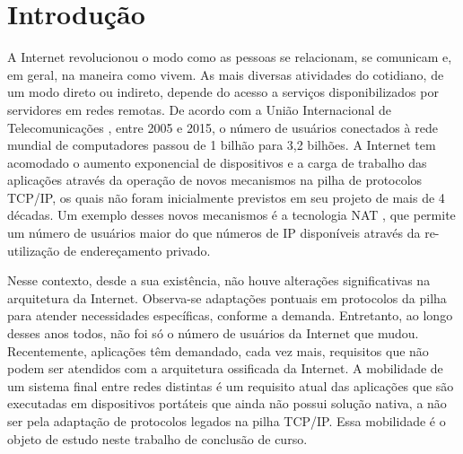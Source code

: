 \documentclass[	12pt, Times, openright, twoside, a4paper, english, brazil]{abntex2}
\begin{document}
\chapter{Introdução}
\setcounter{page}{1}

\par A Internet revolucionou o modo como as pessoas se relacionam, se comunicam e, em geral, na maneira como vivem. As mais diversas atividades do cotidiano, de um modo direto ou indireto, depende do acesso a serviços disponibilizados por servidores em redes remotas. De acordo com a União Internacional de Telecomunicações \cite{itu2016}, entre 2005 e 2015, o número de usuários conectados à rede mundial de computadores passou de 1 bilhão para 3,2 bilhões. A Internet tem acomodado o aumento exponencial de dispositivos e a carga de trabalho das aplicações através da operação de novos mecanismos na pilha de protocolos TCP/IP, os quais não foram inicialmente previstos em seu projeto de mais de 4 décadas. Um exemplo desses novos mecanismos é a tecnologia NAT \cite{rfc4787}, que permite um número de usuários maior do que números de IP disponíveis através da re-utilização de endereçamento privado. 

\par Nesse contexto, desde a sua existência, não houve alterações significativas na arquitetura da Internet. Observa-se adaptações pontuais em protocolos da pilha para atender necessidades específicas, conforme a demanda. Entretanto, ao longo desses anos todos, não foi só o número de usuários da Internet que mudou. Recentemente, aplicações têm demandado, cada vez mais, requisitos que não podem ser atendidos com a arquitetura ossificada da Internet. A mobilidade de um sistema final entre redes distintas é um requisito atual das aplicações que são executadas em dispositivos portáteis que ainda não possui solução nativa, a não ser pela adaptação de protocolos legados na pilha TCP/IP. Essa mobilidade é o objeto de estudo neste trabalho de conclusão de curso.
\end{document}

